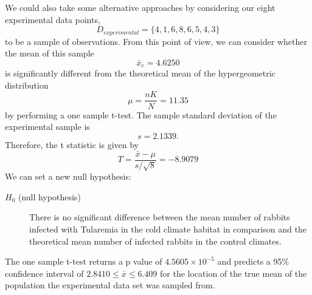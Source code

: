 \documentclass{amsart}
\begin{document}
We could also take some alternative approaches by considering our eight experimental data points, 
\[D_{experimental}=\{4, 1, 6, 8, 6, 5, 4, 3\}\]
to be a sample of observations. From this point of view, we can consider whether the mean of this sample
$$\bar{x}_e=4.6250$$
is significantly different from the theoretical mean of the hypergeometric distribution 
$$\mu=\frac{n K}{N}=11.35$$
by performing a one sample t-test. The sample standard deviation of the experimental sample is $$s=2.1339.$$ Therefore, the t statistic is given by
$$T=\frac{\bar{x}-\mu}{s/\sqrt{8}}=-8.9079$$
We can set a new null hypothesis:
\begin{description}
\item[$H_0$ (null hypothesis)] There is no significant difference between the mean number of rabbits infected with Tularemia in the cold climate habitat in comparison and the theoretical mean number of infected rabbits in the control climates. 
\end{description}
The one sample t-test returns a p value of $4.5605\times 10^{-5}$ and predicts a 95\% confidence interval of $2.8410\le \bar{x}\le 6.409$ for the location of the true mean of the population the experimental data set was sampled from. 
\end{document}
